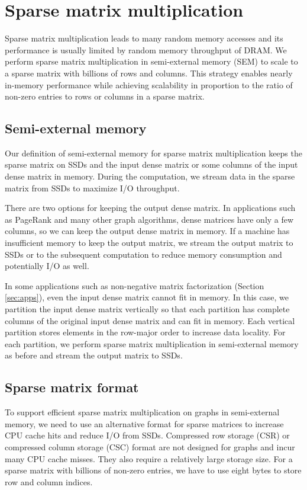 \section{Sparse matrix multiplication} \label{sec:spmm}
Sparse matrix multiplication leads to many random memory
accesses and its performance is usually limited by random memory throughput
of DRAM. We perform sparse matrix multiplication in semi-external memory (SEM)
to scale to a sparse matrix with billions of rows and columns. This strategy enables
nearly in-memory performance while achieving scalability in proportion
to the ratio of non-zero entries to rows or columns in a sparse matrix.

\subsection{Semi-external memory}
Our definition of semi-external memory for sparse matrix multiplication
keeps the sparse matrix on SSDs and the input dense matrix or some columns
of the input dense matrix in memory. During the computation, we stream
data in the sparse matrix from SSDs to maximize I/O throughput.

There are two options for keeping the output dense matrix. In applications
such as PageRank and many other graph
algorithms, dense matrices have only a few columns, so we can keep the output
dense matrix in memory. If a machine has insufficient
memory to keep the output matrix, we stream the output matrix
to SSDs or to the subsequent computation to reduce memory consumption and
potentially I/O as well.

In some applications such as non-negative matrix factorization (Section
\ref{sec:apps}), even the input dense matrix cannot fit in memory. In this case,
we partition the input dense matrix vertically so that each partition has
complete columns of the original input dense matrix and can fit in memory.
Each vertical partition stores elements in the row-major order to increase
data locality. For each partition, we perform sparse matrix multiplication
in semi-external memory as before and stream the output matrix to SSDs.

\subsection{Sparse matrix format}
To support efficient sparse matrix multiplication on graphs in semi-external
memory, we need to use an alternative format for sparse matrices to increase
CPU cache hits and reduce I/O from SSDs. Compressed row
storage (CSR) or compressed column storage (CSC) format are not designed for
graphs and incur many CPU cache misses. They also require
a relatively large storage size. For a sparse matrix with billions of non-zero
entries, we have to use eight bytes to store row and column indices.

